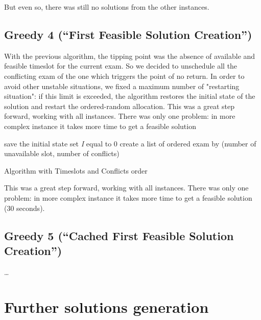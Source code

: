 \documentclass[11pt, a4paper, leqno]{article}
\begin{document}
	But even so, there was still no solutions from the other instances.

	
	\subsection{Greedy 4 (``First Feasible Solution Creation'')}
	
	With the previous algorithm, the tipping point was the absence of available and feasible timeslot for the current exam. So we decided to unschedule all the conflicting exam of the one which triggers the point of no return.
	In order to avoid other unstable situations, we fixed a maximum number of "restarting situation": if this limit is exceeded, the algorithm restores the initial state of the solution and restart the ordered-random allocation. This was a great step forward, working with all instances. There was only one problem: in more complex instance it takes more time to get a feasible solution 
	
	\begin{algorithm}[H]
		save the initial state\;
		set \textit{I} equal to 0\;
		create a list of ordered exam by (number of unavailable slot, number of conflicts)\;
		\caption{Algorithm with Timeslots and Conflicts order}
	\end{algorithm}
	
	 This was a great step forward, working with all instances. There was only one problem: in more complex instance it takes more time to get a feasible solution (30 seconds).
	
	\subsection{Greedy 5 (``Cached First Feasible Solution Creation'')}
	
	\dots
	
	\section{Further solutions generation}
	
\end{document}
